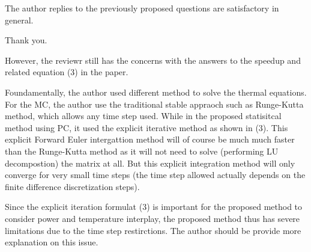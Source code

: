 \begin{reviewer}
The author  replies to the previously proposed questions are satisfactory in general.
\end{reviewer}
\begin{authors}
Thank you.
\end{authors}

\begin{reviewer}
However, the reviewr still has the concerns with the answers to the speedup and related equation (3) in the paper.

Foundamentally, the author used different method to solve the thermal equations. For the MC, the author use the traditional stable appraoch such as Runge-Kutta method, which allows any time step used. While  in the proposed statisitcal method using PC, it used the explicit iterative method as shown in (3). This explicit Forward Euler intergattion method will of course be much much faster than the Runge-Kutta method as it will not need to solve (performing LU decompostion) the matrix at all.  But this explicit integration method will only converge for very small time steps (the time step allowed actually depends on the finite difference discretization steps).

Since the explicit iteration formulat (3) is important for the proposed method to consider power and temperature interplay, the proposed method thus has severe limitations due to the time step restirctions.  The author should be provide more explanation on this issue.
\end{reviewer}
